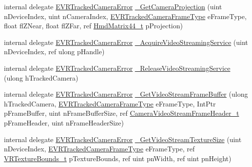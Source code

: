 \begin{DoxyCompactItemize}
internal delegate \mbox{\hyperlink{namespace_valve_1_1_v_r_ad0e012e846f5d93848783c044614cfd3}{E\+V\+R\+Tracked\+Camera\+Error}} \mbox{\hyperlink{struct_valve_1_1_v_r_1_1_i_v_r_tracked_camera_a8c5bac72968c107773b0f8e5dc1b1bf1}{\+\_\+\+Get\+Camera\+Projection}} (uint n\+Device\+Index, uint n\+Camera\+Index, \mbox{\hyperlink{namespace_valve_1_1_v_r_a9962211bc3fe98c2683db188c12c9afd}{E\+V\+R\+Tracked\+Camera\+Frame\+Type}} e\+Frame\+Type, float fl\+Z\+Near, float fl\+Z\+Far, ref \mbox{\hyperlink{struct_valve_1_1_v_r_1_1_hmd_matrix44__t}{Hmd\+Matrix44\+\_\+t}} p\+Projection)
\item 
internal delegate \mbox{\hyperlink{namespace_valve_1_1_v_r_ad0e012e846f5d93848783c044614cfd3}{E\+V\+R\+Tracked\+Camera\+Error}} \mbox{\hyperlink{struct_valve_1_1_v_r_1_1_i_v_r_tracked_camera_ac535815424bd4d396ab6ddc1e92065e5}{\+\_\+\+Acquire\+Video\+Streaming\+Service}} (uint n\+Device\+Index, ref ulong p\+Handle)
\item 
internal delegate \mbox{\hyperlink{namespace_valve_1_1_v_r_ad0e012e846f5d93848783c044614cfd3}{E\+V\+R\+Tracked\+Camera\+Error}} \mbox{\hyperlink{struct_valve_1_1_v_r_1_1_i_v_r_tracked_camera_ab377dd8e389c9aa7962d424d91a9043b}{\+\_\+\+Release\+Video\+Streaming\+Service}} (ulong h\+Tracked\+Camera)
\item 
internal delegate \mbox{\hyperlink{namespace_valve_1_1_v_r_ad0e012e846f5d93848783c044614cfd3}{E\+V\+R\+Tracked\+Camera\+Error}} \mbox{\hyperlink{struct_valve_1_1_v_r_1_1_i_v_r_tracked_camera_afdef1fed34343a2452be09cbe044d9ed}{\+\_\+\+Get\+Video\+Stream\+Frame\+Buffer}} (ulong h\+Tracked\+Camera, \mbox{\hyperlink{namespace_valve_1_1_v_r_a9962211bc3fe98c2683db188c12c9afd}{E\+V\+R\+Tracked\+Camera\+Frame\+Type}} e\+Frame\+Type, Int\+Ptr p\+Frame\+Buffer, uint n\+Frame\+Buffer\+Size, ref \mbox{\hyperlink{struct_valve_1_1_v_r_1_1_camera_video_stream_frame_header__t}{Camera\+Video\+Stream\+Frame\+Header\+\_\+t}} p\+Frame\+Header, uint n\+Frame\+Header\+Size)
\item 
internal delegate \mbox{\hyperlink{namespace_valve_1_1_v_r_ad0e012e846f5d93848783c044614cfd3}{E\+V\+R\+Tracked\+Camera\+Error}} \mbox{\hyperlink{struct_valve_1_1_v_r_1_1_i_v_r_tracked_camera_a8a269f673569d9678c1389d30b523de4}{\+\_\+\+Get\+Video\+Stream\+Texture\+Size}} (uint n\+Device\+Index, \mbox{\hyperlink{namespace_valve_1_1_v_r_a9962211bc3fe98c2683db188c12c9afd}{E\+V\+R\+Tracked\+Camera\+Frame\+Type}} e\+Frame\+Type, ref \mbox{\hyperlink{struct_valve_1_1_v_r_1_1_v_r_texture_bounds__t}{V\+R\+Texture\+Bounds\+\_\+t}} p\+Texture\+Bounds, ref uint pn\+Width, ref uint pn\+Height)

\end{DoxyCompactItemize}
